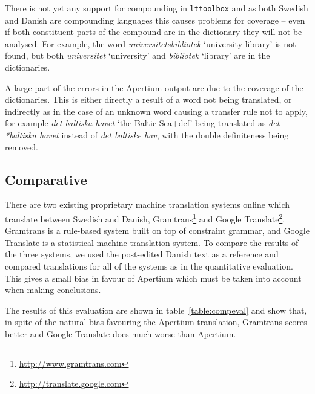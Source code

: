 \documentclass[11pt]{article}
\begin{document}
There is not yet any support for compounding in {\tt {\small lttoolbox}} and as
both Swedish and Danish are compounding languages this causes problems for 
coverage -- even if both constituent parts of the compound are in the dictionary they
will not be analysed. For example, the word \emph{universitetsbibliotek} `university library' is 
not found, but both \emph{universitet} `university' and \emph{bibliotek} `library'
are in the dictionaries.

A large part of the errors in the Apertium output are due to the coverage of the 
dictionaries. This is either directly a result of a word not being translated, or indirectly
as in the case of an unknown word causing a transfer rule not to apply, for example
\emph{det baltiska havet} `the Baltic Sea+{\sc def}' being translated as \emph{det *baltiska havet}
instead of \emph{det baltiske hav}, with the double definiteness being removed.

\subsection{Comparative}


There are two existing proprietary machine translation systems online which translate 
between Swedish and Danish, Gramtrans\footnote{\url{http://www.gramtrans.com}} and Google
Translate\footnote{\url{http://translate.google.com}}. Gramtrans is a rule-based system
built on top of constraint grammar, and Google Translate is a statistical machine translation
system. To compare the results of the three systems, we used the post-edited Danish text as a
reference and compared translations for all of the systems as in the quantitative evaluation.
This gives a small bias in favour of Apertium which must be taken into account when making conclusions.


The results of this evaluation are shown in table~\ref{table:compeval} and show that, in spite 
of the natural bias favouring the Apertium translation, Gramtrans scores better and Google 
Translate does much worse than Apertium. 
\end{document}
